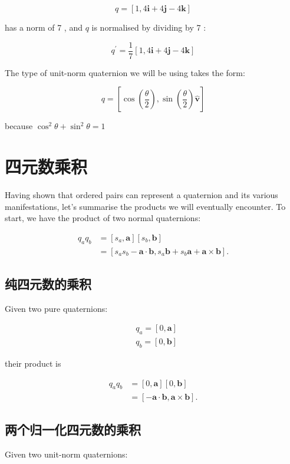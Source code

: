 $$
    q=[1,4 \mathbf{i}+4 \mathbf{j}-4 \mathbf{k}]
$$

has a norm of 7 , and $q$ is normalised by dividing by 7 :

$$
    q^{\prime}=\frac{1}{7}[1,4 \mathbf{i}+4 \mathbf{j}-4 \mathbf{k}]
$$

The type of unit-norm quaternion we will be using takes the form:

$$
    q=\left[\cos \left(\frac{\theta}{2}\right), \sin \left(\frac{\theta}{2}\right) \hat{\mathbf{v}}\right]
$$

because $\cos ^{2} \theta+\sin ^{2} \theta=1$

\section{四元数乘积}
Having shown that ordered pairs can represent a quaternion and its various manifestations, let's summarise the products we will eventually encounter. To start, we have the product of two normal quaternions:

$$
    \begin{aligned}
        q_{a} q_{b} & =\left[s_{a}, \mathbf{a}\right]\left[s_{b}, \mathbf{b}\right]                                                           \\
                    & =\left[s_{a} s_{b}-\mathbf{a} \cdot \mathbf{b}, s_{a} \mathbf{b}+s_{b} \mathbf{a}+\mathbf{a} \times \mathbf{b}\right] .
    \end{aligned}
$$

\subsection{纯四元数的乘积}
Given two pure quaternions:

$$
    \begin{aligned}
         & q_{a}=[0, \mathbf{a}] \\
         & q_{b}=[0, \mathbf{b}]
    \end{aligned}
$$

their product is

$$
    \begin{aligned}
        q_{a} q_{b} & =[0, \mathbf{a}][0, \mathbf{b}]                                 \\
                    & =[-\mathbf{a} \cdot \mathbf{b}, \mathbf{a} \times \mathbf{b}] .
    \end{aligned}
$$

\subsection{两个归一化四元数的乘积}
Given two unit-norm quaternions:

